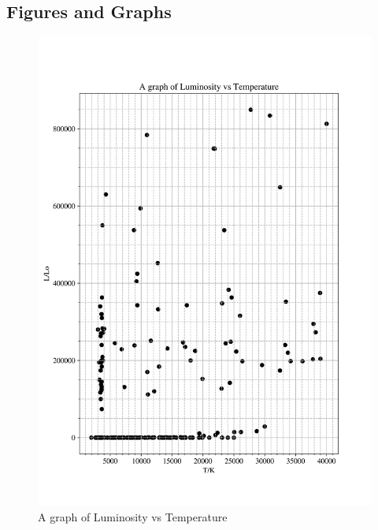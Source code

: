 \documentclass[12pt, a4paper]{article}
\begin{document}
\subsection{Figures and Graphs}
\begin{figure}[H]
    \centering
    \includegraphics[width = \textwidth]{2Plot1.png}
    \caption{A graph of Luminosity vs Temperature}
    \label{fig:Fig 2.1}
\end{figure}
\end{document}

